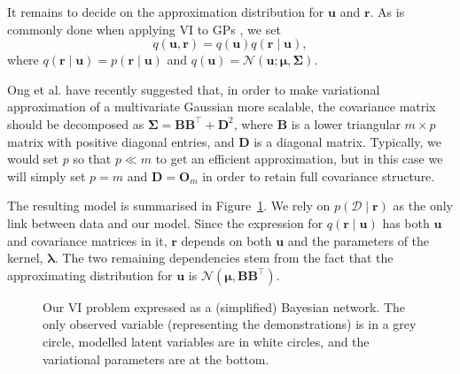 \documentclass{mpaper}
\newcommand{\approximation}{q(\mathbf{u}, \mathbf{r})}
\begin{document}
It remains to decide on the approximation distribution for $\mathbf{u}$ and
$\mathbf{r}$. As is commonly done when applying VI to GPs
\cite{DBLP:conf/nips/ChengB17}, we set
\begin{equation} \label{eq:approximation}
  \approximation = q(\mathbf{u}) q(\mathbf{r} \mid \mathbf{u}),
\end{equation}
where $q(\mathbf{r} \mid \mathbf{u}) = p(\mathbf{r} \mid \mathbf{u})$ and
$q(\mathbf{u}) = \mathcal{N}(\mathbf{u}; \bm\mu, \bm\Sigma)$.

Ong et al. \cite{ong2018gaussian} have recently suggested that, in order to make
variational approximation of a multivariate Gaussian more scalable, the
covariance matrix should be decomposed as $\bm\Sigma =
\mathbf{B}\mathbf{B}^\intercal + \mathbf{D}^2$, where $\mathbf{B}$ is a lower
triangular $m \times p$ matrix with positive diagonal entries, and $\mathbf{D}$
is a diagonal matrix. Typically, we would set $p$ so that $p \ll m$ to get an
efficient approximation, but in this case we will simply set $p = m$ and
$\mathbf{D} = \mathbf{O}_m$ in order to retain full covariance structure.

The resulting model is summarised in Figure~\ref{fig:graphical_model}. We rely
on $p(\mathcal{D} \mid \mathbf{r})$ as the only link between data and our model.
Since the expression for $q(\mathbf{r} \mid \mathbf{u})$ has both $\mathbf{u}$
and covariance matrices in it, $\mathbf{r}$ depends on both $\mathbf{u}$ and the
parameters of the kernel, $\bm\lambda$. The two remaining dependencies stem from
the fact that the approximating distribution for $\mathbf{u}$ is
$\mathcal{N}(\bm\mu, \mathbf{BB}^\intercal)$.

\begin{figure}
  \centering
  \caption{Our VI problem expressed as a (simplified)
    Bayesian network. The only observed variable (representing the
    demonstrations) is in a grey circle, modelled latent variables are in white
    circles, and the variational parameters are at the bottom.}
  \label{fig:graphical_model}
\end{figure}
\end{document}
